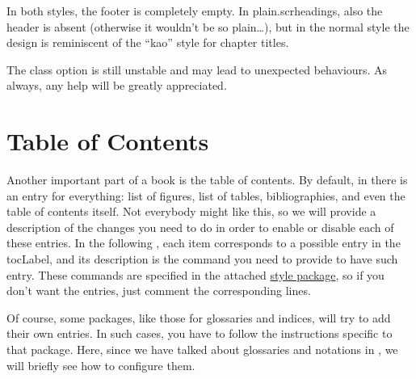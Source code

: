 In both styles, the footer is completely empty. In plain.scrheadings,
also the header is absent (otherwise it wouldn't be so plain\ldots), but 
in the normal style the design is reminiscent of the \enquote{kao} style
for chapter titles.

\begin{kaobox}[frametitle=To Do]
The  class option is still unstable and may lead to 
unexpected behaviours. As always, any help will be greatly appreciated.
\end{kaobox}

\section{Table of Contents}

Another important part of a book is the table of contents. By default, 
in  there is an entry for everything: list of figures, 
list of tables, bibliographies, and even the table of contents itself. 
Not everybody might like this, so we will provide a description of the 
changes you need to do in order to enable or disable each of these 
entries. In the following , each item corresponds to 
a possible entry in the \acrshort{tocLabel}, and its description is the 
command you need to provide to have such entry. These commands are 
specified in the attached \href{style/style.sty}{style 
package}, so if you don't want the entries, just comment the 
corresponding lines.

Of course, some packages, like those for glossaries and indices, will 
try to add their own entries. In such cases, you have to follow the 
instructions specific to that package. Here, since we have talked about 
glossaries and notations in , we will briefly see how
to configure them.

